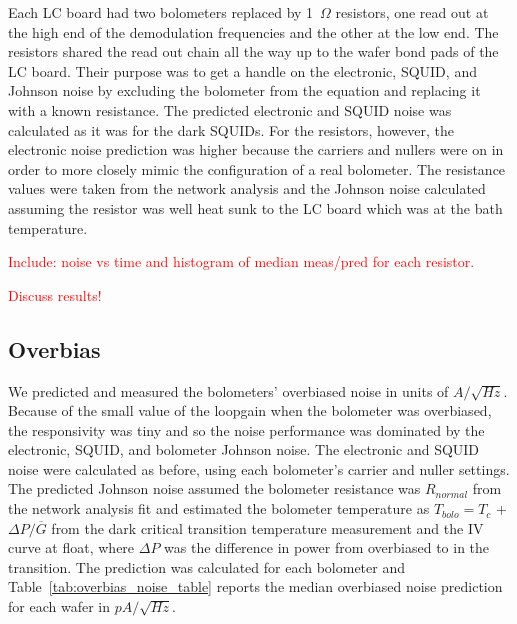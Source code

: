 Each \ac{LC} board had two bolometers replaced by 1~$\Omega$ resistors, one read out at the high end of the demodulation frequencies and the other at the low end. 
The resistors shared the read out chain all the way up to the wafer bond pads of the LC board. 
Their purpose was to get a handle on the electronic, \ac{SQUID}, and Johnson noise by excluding the bolometer from the equation and replacing it with a known resistance. 
The predicted electronic and \ac{SQUID} noise was calculated as it was for the dark \ac{SQUID}s. 
For the resistors, however, the electronic noise prediction was higher because the carriers and nullers were on in order to more closely mimic the configuration of a real bolometer. 
The resistance values were taken from the network analysis and the Johnson noise calculated assuming the resistor was well heat sunk to the \ac{LC} board which was at the bath temperature. 

\textcolor{red}{Include:
noise vs time and histogram of median meas/pred for each resistor. }

\textcolor{red}{Discuss results!}

\subsection{Overbias}
\label{sec:overbias_noise}

We predicted and measured the bolometers' overbiased noise in units of $A/\sqrt{Hz}$.  
Because of the small value of the loopgain when the bolometer was overbiased, the responsivity was tiny and so the noise performance was dominated by the electronic, \ac{SQUID}, and bolometer Johnson noise. 
The electronic and \ac{SQUID} noise were calculated as before, using each bolometer's carrier and nuller settings. 
The predicted Johnson noise assumed the bolometer resistance was $R_{normal}$ from the network analysis fit and estimated the bolometer temperature as $T_{bolo} = T_{c}$ + $\Delta P / \overline{G}$ from the dark critical transition temperature measurement and the IV curve at float, where $\Delta P$ was the difference in power from overbiased to in the transition. 
The prediction was calculated for each bolometer and Table~\ref{tab:overbias_noise_table} reports the median overbiased noise prediction for each wafer in $pA/\sqrt{Hz}$. %

